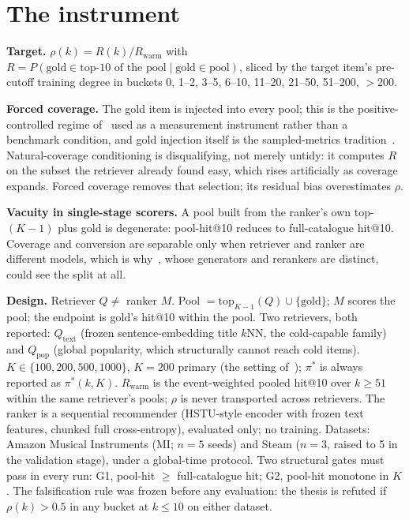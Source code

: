 \documentclass[sigconf,anonymous,review]{acmart}
\begin{document}
\section{The instrument}
\label{sec:instrument}
\textbf{Target.} $\rho(k)=R(k)/R_{\mathrm{warm}}$ with $R=P(\text{gold}\in\text{top-10 of the pool}\mid\text{gold}\in\text{pool})$, sliced by the target item's pre-cutoff training degree in buckets 0, 1--2, 3--5, 6--10, 11--20, 21--50, 51--200, $>$200.

\textbf{Forced coverage.} The gold item is injected into every pool; this is the positive-controlled regime of~\cite{dualregime} used as a measurement instrument rather than a benchmark condition, and gold injection itself is the sampled-metrics tradition~\cite{sampled}. Natural-coverage conditioning is disqualifying, not merely untidy: it computes $R$ on the subset the retriever already found easy, which rises artificially as coverage expands. Forced coverage removes that selection; its residual bias overestimates $\rho$.

\textbf{Vacuity in single-stage scorers.} A pool built from the ranker's own top-$(K{-}1)$ plus gold is degenerate: pool-hit@10 reduces to full-catalogue hit@10. Coverage and conversion are separable only when retriever and ranker are different models, which is why~\cite{bottleneck}, whose generators and rerankers are distinct, could see the split at all.

\textbf{Design.} Retriever $Q\neq$ ranker $M$. Pool $=\mathrm{top}_{K-1}(Q)\cup\{\text{gold}\}$; $M$ scores the pool; the endpoint is gold's hit@10 within the pool. Two retrievers, both reported: $Q_{\mathrm{text}}$ (frozen sentence-embedding title $k$NN, the cold-capable family) and $Q_{\mathrm{pop}}$ (global popularity, which structurally cannot reach cold items). $K\in\{100,200,500,1000\}$, $K{=}200$ primary (the setting of~\cite{bottleneck}); $\pi^*$ is always reported as $\pi^*(k,K)$. $R_{\mathrm{warm}}$ is the event-weighted pooled hit@10 over $k\ge 51$ within the same retriever's pools; $\rho$ is never transported across retrievers. The ranker is a sequential recommender (HSTU-style encoder with frozen text features, chunked full cross-entropy), evaluated only; no training. Datasets: Amazon Musical Instruments (MI; $n{=}5$ seeds) and Steam ($n{=}3$, raised to 5 in the validation stage), under a global-time protocol. Two structural gates must pass in every run: G1, pool-hit $\ge$ full-catalogue hit; G2, pool-hit monotone in $K$. The falsification rule was frozen before any evaluation: the thesis is refuted if $\rho(k)>0.5$ in any bucket at $k\le 10$ on either dataset.
\end{document}

